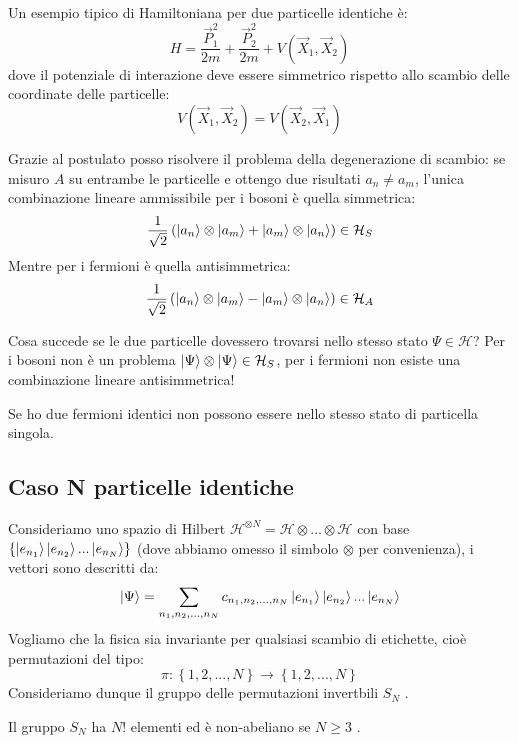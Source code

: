 \begin{example}
    Un esempio tipico di Hamiltoniana per due particelle identiche è:
    \[
    H = \frac{\vec{P}_1^2}{2m} + \frac{\vec{P}_2^2}{2m} + V(\vec{X}_1, \vec{X}_2)
    \]
    dove il potenziale di interazione deve essere simmetrico rispetto allo scambio delle coordinate delle particelle:
    \[
    V(\vec{X}_1, \vec{X}_2) = V(\vec{X}_2, \vec{X}_1)
    \]
\end{example}

Grazie al postulato posso risolvere il problema della degenerazione di scambio: se misuro \(A\) su entrambe le particelle e ottengo due risultati \(a_n \neq a_m\), 
l'unica combinazione lineare ammissibile per i bosoni è quella simmetrica:
\begin{equation}
    \frac{1}{\sqrt{2}}\left( \ket{a_n}\otimes\ket{a_m} + \ket{a_m}\otimes \ket{a_n} \right)  \in \mathcal{H}_S
\end{equation}
Mentre per i fermioni è quella antisimmetrica:
\begin{equation}
    \frac{1}{\sqrt{2}}\left( \ket{a_n}\otimes\ket{a_m} - \ket{a_m}\otimes \ket{a_n} \right)  \in \mathcal{H}_A
\end{equation}

\begin{attention}
    Cosa succede se le due particelle dovessero trovarsi nello stesso stato \(\Psi \in \mathcal{H}\)? Per i bosoni non è un problema \(\ket{\Psi}\otimes\ket{\Psi} \in \mathcal{H}_S\),
    per i fermioni non esiste una combinazione lineare antisimmetrica!
\end{attention}

\begin{pauli}
    \label{theo: Pauli}
    Se ho due fermioni identici non possono essere nello stesso stato di particella singola.
\end{pauli}


\subsection{Caso N particelle identiche}
Consideriamo uno spazio di Hilbert \(\mathcal{H}^{\otimes N}= \mathcal{H}\otimes...\otimes \mathcal{H}\) con base \(\left\{ \ket{e_{n_1}}\ket{e_{n_2}}...\ket{e_{n_N}} \right\}\) (dove abbiamo omesso il simbolo \(\otimes\) per convenienza), i vettori sono descritti da:
\begin{equation}
    \ket{\Psi} = \sum_{n_1,n_2,...,n_N}c_{n_1,n_2,..., n_N}\ket{e_{n_1}}\ket{e_{n_2}}...\ket{e_{n_N}}
\end{equation}
Vogliamo che la fisica sia invariante per qualsiasi scambio di etichette, cioè permutazioni del tipo:
\begin{equation}
    \pi : \left\{ 1,2,...,N \right\}\to \left\{ 1,2,..., N \right\}
\end{equation}
Consideriamo dunque il gruppo delle permutazioni invertbili \(S_N\) .
\begin{remark}
    Il gruppo \(S_N\) ha \(N!\) elementi ed è non-abeliano se \(N\geq 3\) .
\end{remark}

